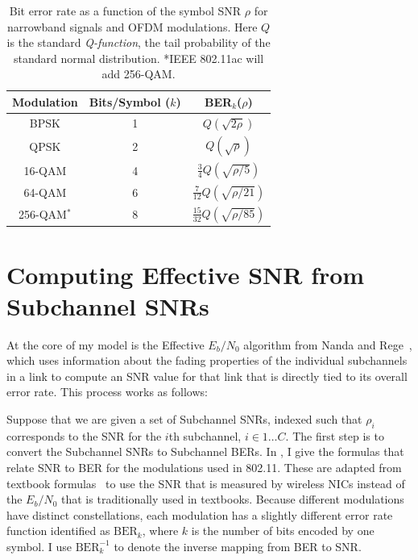 \begin{table}
\centering
\begin{tabular}{ccc}
\toprule
Modulation & Bits/Symbol ($k$) & BER$_k$($\rho$) \\
\midrule BPSK & 1 & $Q\left(\sqrt{2\rho}\right)$ \\
QPSK & 2 & $Q\left(\sqrt{\rho}\right)$\\
16-QAM & 4 & $\frac{3}{4}Q\left(\sqrt{\rho/5}\right)$\\
64-QAM & 6 & $\frac{7}{12}Q\left(\sqrt{\rho/21}\right)$\\
256-QAM$^*$ & 8 & $\frac{15}{32}Q\left(\sqrt{\rho/85}\right)$\\
\bottomrule
\end{tabular}
\caption[Bit error rate as a function of the symbol SNR for OFDM modulations]{\label{tab:ber_snr}Bit error rate as a function of the symbol SNR $\rho$ for narrowband signals and OFDM modulations. Here $Q$ is the standard \emph{Q-function}, the tail probability of the standard normal distribution. *IEEE 802.11ac will add 256-QAM.}
\end{table}

\section{Computing Effective SNR from Subchannel SNRs}
At the core of my model is the Effective $E_b/N_0$ algorithm from Nanda and Rege~\cite{Nanda_EffectiveSNR}, which uses information about the fading properties of the individual subchannels in a link to compute an SNR value for that link that is directly tied to its overall error rate. This process works as follows:

Suppose that we are given a set of Subchannel SNRs, indexed such that $\rho_i$ corresponds to the SNR for the $i$th subchannel, $i\in1\dots C$. The first step is to convert the Subchannel SNRs to Subchannel BERs. In , I give the formulas that relate SNR to BER for the modulations used in 802.11. These are adapted from textbook formulas~\cite[\S3.7.1 and \S7.9.3.1]{Sklar} to use the SNR that is measured by wireless NICs instead of the $E_b/N_0$ that is traditionally used in textbooks. Because different modulations have distinct constellations, each modulation has a slightly different error rate function identified as $\text{BER}_k$, where $k$ is the number of bits encoded by one symbol. I use $\text{BER}_k^{-1}$ to denote the inverse mapping from BER to SNR.

